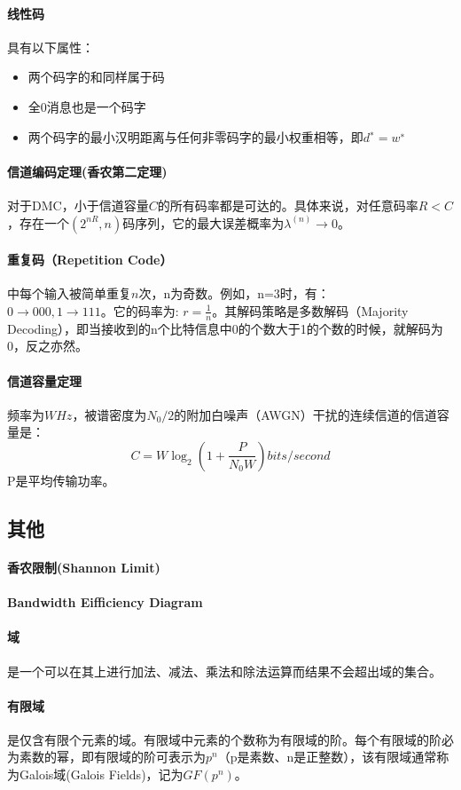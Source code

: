 \documentclass[10pt,letterpaper]{article}
\begin{document}
\paragraph{线性码} 具有以下属性：
\begin{itemize}
	\item 两个码字的和同样属于码
	\item 全0消息也是一个码字
	\item 两个码字的最小汉明距离与任何非零码字的最小权重相等，即$d^∗ = w^∗$
\end{itemize}

\paragraph{信道编码定理(香农第二定理)} 对于DMC，小于信道容量$C$的所有码率都是可达的。具体来说，对任意码率$R<C$，存在一个$(2^{nR},n)$码序列，它的最大误差概率为$\lambda^{(n)} \rightarrow 0$。

\paragraph{重复码（Repetition Code）}中每个输入被简单重复$n$次，n为奇数。例如，n=3时，有： \\
$ 0 \rightarrow 000, 1 \rightarrow 111 $。它的码率为: $r=\frac{1}{n}$。其解码策略是多数解码（Majority Decoding），即当接收到的n个比特信息中0的个数大于1的个数的时候，就解码为0，反之亦然。

\paragraph{信道容量定理} 频率为$W Hz$，被谱密度为$N_0/2$的附加白噪声（AWGN）干扰的连续信道的信道容量是：
\begin{equation}
	C = W\log_2(1+\frac{P}{N_0W} ) bits/second
\end{equation}
P是平均传输功率。






\subsection{其他}
\paragraph{香农限制(Shannon Limit)}

\paragraph{Bandwidth Eifficiency Diagram}

\paragraph{域} 是一个可以在其上进行加法、减法、乘法和除法运算而结果不会超出域的集合。
\paragraph{有限域} 是仅含有限个元素的域。有限域中元素的个数称为有限域的阶。每个有限域的阶必为素数的幂，即有限域的阶可表示为$p^n$（p是素数、n是正整数），该有限域通常称为Galois域(Galois Fields)，记为$GF(p^n)$。







\end{document}
